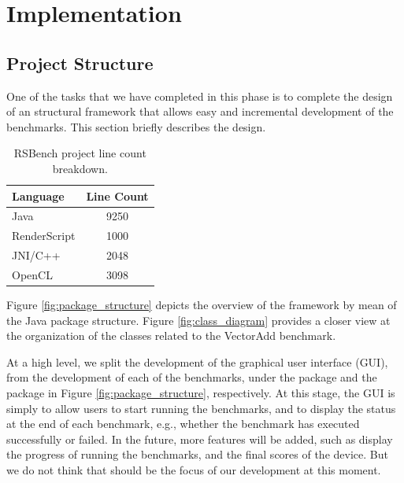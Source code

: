 \section*{Implementation}

\subsection*{Project Structure}

One of the tasks that we have completed in this phase is to complete the design
of an structural framework that allows easy and incremental development of the
benchmarks. This section briefly describes the design.


\begin{table}[h]\small
\centering
\begin{tabular}{ | l | c |}
    \hline 
    Language &  Line Count \\ \hline
    Java & 9250 \\ \hline
    RenderScript & 1000 \\ \hline
    JNI/C++ & 2048 \\ \hline
    OpenCL & 3098 \\ \hline
    \hline
\end{tabular}
\caption{RSBench project line count breakdown.}
\label{table:breakdown}
\end{table}

Figure \ref{fig:package_structure} depicts the overview of the framework by mean
of the Java package structure. Figure \ref{fig:class_diagram} provides a closer
view at the organization of the classes related to the VectorAdd benchmark.

At a high level, we split the development of the graphical user interface (GUI),
from the development of each of the benchmarks, under the  package and the
 package in Figure \ref{fig:package_structure}, respectively. At this
stage, the GUI is simply to allow users to start running the benchmarks, and to 
display the status at the end of each benchmark, e.g., whether the benchmark has executed
successfully or failed. In the future, more features will be added, such as
display the progress of running the benchmarks, and the final scores of the
device. But we do not think that should be the focus of our development at this
moment.

